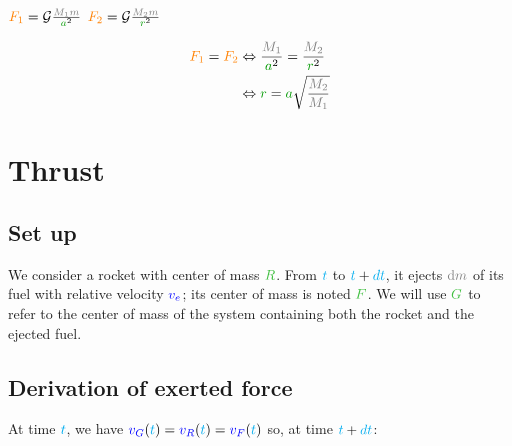 $\force{F_1} = \mathcal G \frac {\mass{M_1} \mass{m}} {\dist{a}^2}$
$\force{F_2} = \mathcal G \frac {\mass{M_2} \mass{m}} {\dist{r}^2}$

\begin{align*}
\force{F_1} = \force{F_2}
& \Leftrightarrow \frac {\mass{M_1}} {\dist{a}^2} = \frac {\mass{M_2}} {\dist{r}^2} \\
& \Leftrightarrow \dist{r} = \dist{a} \sqrt{\frac {\mass{M_2}} {\mass{M_1}}} \\
\end{align*}



\section{Thrust}


\subsection{Set up}

We consider a rocket with center of mass $\posit{R}$. From $\textcolor{cyan}{t}$ to
$\textcolor{cyan}{t}+\textcolor{cyan}{dt}$, it ejects $\mass{\dm}$ of its fuel with relative
velocity $\textcolor{blue}{v_e}$; its center of mass is noted $\posit{F}$. We will
use $\posit{G}$ to refer to the center of mass of the system containing
both the rocket and the ejected fuel.


\subsection{Derivation of exerted force}

At time $\textcolor{cyan}{t}$, we have $\textcolor{blue}{v_G}(\textcolor{cyan}{t}) =
\textcolor{blue}{v_R}(\textcolor{cyan}{t}) = \textcolor{blue}{v_F}(\textcolor{cyan}{t})$ so, at time
$\textcolor{cyan}{t}+\textcolor{cyan}{dt}$:

